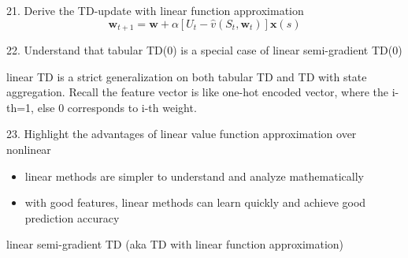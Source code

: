 \documentclass[sutton_barto_notes.tex]{subfiles}
\begin{document}
21. Derive the TD-update with linear function approximation 
$$\bm{w}_{t+1} = \bm{w} + \alpha[U_t - \hat{v}(S_t, \bm{w}_t)]\bm{x}(s)$$

22. Understand that tabular TD(0) is a special case of linear semi-gradient TD(0)

linear TD is a strict generalization on both tabular TD and TD with state aggregation. Recall the feature vector is like one-hot encoded vector, where the i-th=1, else 0 corresponds to i-th weight. 

23. Highlight the advantages of linear value function approximation over nonlinear 

\begin{itemize}
\item linear methods are simpler to understand and analyze mathematically
\item with good features, linear methods can learn quickly and achieve good prediction accuracy
\end{itemize}

linear semi-gradient TD (aka TD with linear function approximation)
\end{document}

